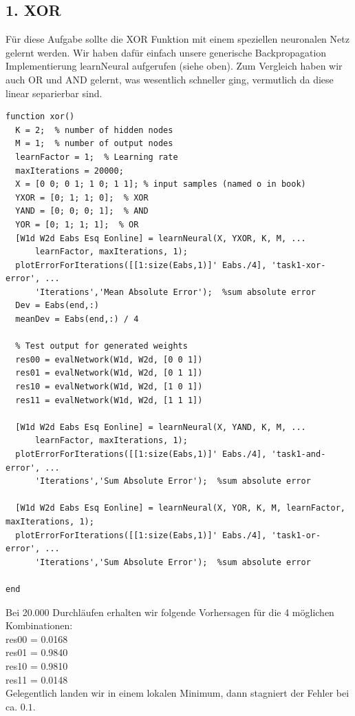 \documentclass{article}
\begin{document}
\subsection*{1. XOR}
Für diese Aufgabe sollte die XOR Funktion mit einem speziellen neuronalen Netz gelernt werden. Wir haben dafür einfach unsere generische Backpropagation Implementierung learnNeural aufgerufen (siehe oben).
Zum Vergleich haben wir auch OR und AND gelernt, was wesentlich schneller ging, vermutlich da diese linear separierbar sind.\\
\begin{lstlisting}
function xor()
  K = 2;  % number of hidden nodes
  M = 1;  % number of output nodes
  learnFactor = 1;  % Learning rate
  maxIterations = 20000;
  X = [0 0; 0 1; 1 0; 1 1]; % input samples (named o in book)
  YXOR = [0; 1; 1; 0];  % XOR
  YAND = [0; 0; 0; 1];  % AND
  YOR = [0; 1; 1; 1];  % OR
  [W1d W2d Eabs Esq Eonline] = learnNeural(X, YXOR, K, M, ...
      learnFactor, maxIterations, 1);
  plotErrorForIterations([[1:size(Eabs,1)]' Eabs./4], 'task1-xor-error', ...
      'Iterations','Mean Absolute Error');  %sum absolute error
  Dev = Eabs(end,:)
  meanDev = Eabs(end,:) / 4

  % Test output for generated weights
  res00 = evalNetwork(W1d, W2d, [0 0 1])
  res01 = evalNetwork(W1d, W2d, [0 1 1])
  res10 = evalNetwork(W1d, W2d, [1 0 1])
  res11 = evalNetwork(W1d, W2d, [1 1 1])

  [W1d W2d Eabs Esq Eonline] = learnNeural(X, YAND, K, M, ...
      learnFactor, maxIterations, 1);
  plotErrorForIterations([[1:size(Eabs,1)]' Eabs./4], 'task1-and-error', ...
      'Iterations','Sum Absolute Error');  %sum absolute error

  [W1d W2d Eabs Esq Eonline] = learnNeural(X, YOR, K, M, learnFactor, maxIterations, 1);
  plotErrorForIterations([[1:size(Eabs,1)]' Eabs./4], 'task1-or-error', ...
      'Iterations','Sum Absolute Error');  %sum absolute error

end
\end{lstlisting}

Bei 20.000 Durchläufen erhalten wir folgende Vorhersagen für die 4 möglichen Kombinationen:\\
res00 = 0.0168\\
res01 = 0.9840\\
res10 = 0.9810\\
res11 = 0.0148\\

Gelegentlich landen wir in einem lokalen Minimum, dann stagniert der Fehler bei ca. $ 0.1 $.\\
\end{document}
